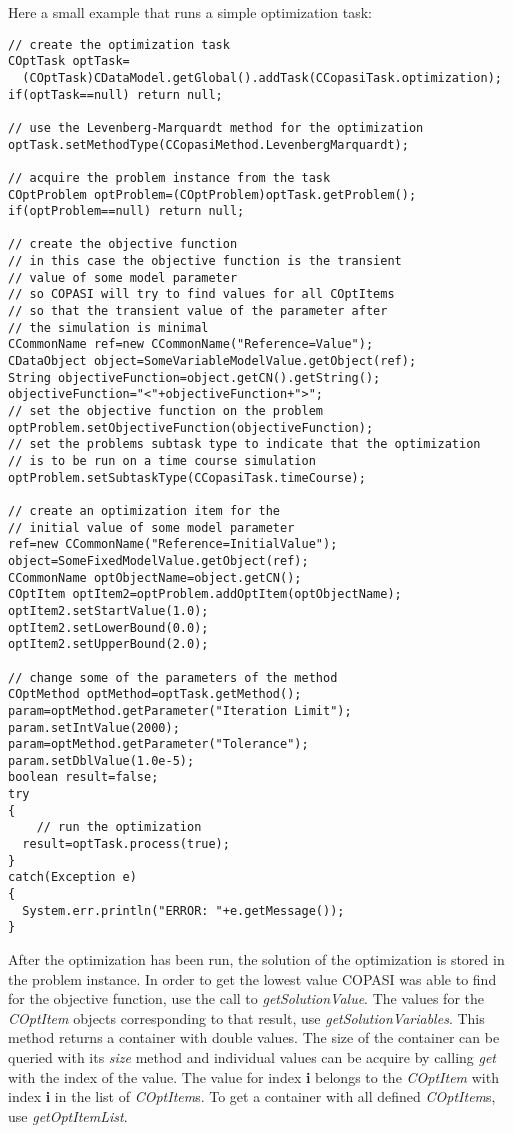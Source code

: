 \documentclass[a4,10pt]{article}
\begin{document}
Here a small example that runs a simple optimization task:

\begin{lstlisting}
// create the optimization task
COptTask optTask=
  (COptTask)CDataModel.getGlobal().addTask(CCopasiTask.optimization);
if(optTask==null) return null;

// use the Levenberg-Marquardt method for the optimization
optTask.setMethodType(CCopasiMethod.LevenbergMarquardt);

// acquire the problem instance from the task
COptProblem optProblem=(COptProblem)optTask.getProblem();
if(optProblem==null) return null;

// create the objective function
// in this case the objective function is the transient
// value of some model parameter
// so COPASI will try to find values for all COptItems
// so that the transient value of the parameter after
// the simulation is minimal
CCommonName ref=new CCommonName("Reference=Value");
CDataObject object=SomeVariableModelValue.getObject(ref);
String objectiveFunction=object.getCN().getString();
objectiveFunction="<"+objectiveFunction+">";
// set the objective function on the problem
optProblem.setObjectiveFunction(objectiveFunction);
// set the problems subtask type to indicate that the optimization
// is to be run on a time course simulation
optProblem.setSubtaskType(CCopasiTask.timeCourse);

// create an optimization item for the 
// initial value of some model parameter
ref=new CCommonName("Reference=InitialValue");
object=SomeFixedModelValue.getObject(ref);
CCommonName optObjectName=object.getCN();
COptItem optItem2=optProblem.addOptItem(optObjectName);
optItem2.setStartValue(1.0);
optItem2.setLowerBound(0.0);
optItem2.setUpperBound(2.0);

// change some of the parameters of the method
COptMethod optMethod=optTask.getMethod();
param=optMethod.getParameter("Iteration Limit");
param.setIntValue(2000);
param=optMethod.getParameter("Tolerance");
param.setDblValue(1.0e-5);
boolean result=false;
try
{
    // run the optimization
  result=optTask.process(true);
}
catch(Exception e)
{
  System.err.println("ERROR: "+e.getMessage());
}
\end{lstlisting}

After the optimization has been run, the solution of the optimization is stored in the problem instance.
In order to get the lowest value COPASI was able to find for the objective function, use the call to \textit{getSolutionValue}.
The values for the \textit{COptItem} objects corresponding to that result, use \textit{getSolutionVariables}. This method returns a container with double values. The size of the container can be queried with its \textit{size} method and individual values can be acquire by calling \textit{get} with the index of the value. The value for index \textbf{i} belongs to the \textit{COptItem} with index \textbf{i} in the list of \textit{COptItem}s.  To get a container with all defined \textit{COptItem}s, use \textit{getOptItemList}.
\end{document}
